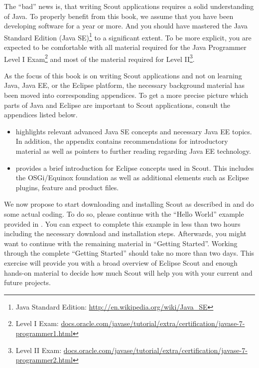 \documentclass[a4paper,10pt,twoside]{book}
\begin{document}
The ``bad'' news is, that writing Scout applications requires a solid understanding of Java.
To properly benefit from this book, we assume that you have been developing software for a year or more.
And you should have mastered the Java Standard Edition 
(Java SE)\footnote{Java Standard Edition: \url{http://en.wikipedia.org/wiki/Java_SE}} to a significant extent. 
To be more explicit, you are expected to be comfortable with all material required for the Java Programmer Level I 
Exam\footnote{Level I Exam: \url{docs.oracle.com/javase/tutorial/extra/certification/javase-7-programmer1.html}}
and most of the material required for 
Level II\footnote{Level II Exam: \url{docs.oracle.com/javase/tutorial/extra/certification/javase-7-programmer2.html}}.

As the focus of this book is on writing Scout applications and not on learning Java, Java EE, or the Eclipse platform, the necessary background material has been moved into corresponding appendices.
To get a more precise picture which parts of Java and Eclipse are important to Scout applications, consult the appendices listed below.

\begin{itemize}
  \item {} highlights relevant advanced Java SE concepts and necessary Java EE topics. 
        In addition, the appendix contains recommendations for introductory material as well as pointers to further reading regarding Java EE technology.
  \item {} provides a brief introduction for Eclipse concepts used in Scout. 
        This includes the OSGi/Equinox foundation as well as additional elements such as Eclipse plugins, feature and product files.
\end{itemize}

We now propose to start downloading and installing Scout as described in  and do some actual coding.
To do so, please continue with the ``Hello World'' example provided in .
You can expect to complete this example in less than two hours including the necessary download and installation steps.
Afterwards, you might want to continue with the remaining material in ``Getting Started''. 
Working through the complete ``Getting Started'' should take no more than two days. 
This exercise will provide you with a broad overview of Eclipse Scout and enough hands-on material to decide how much Scout will help you with your current and future projects.
\end{document}
